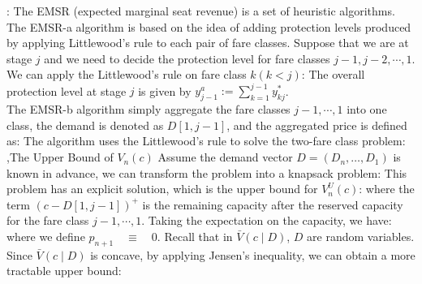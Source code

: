 \documentclass[12pt]{report}
\begin{document}
: The EMSR (expected marginal seat revenue) is a set of heuristic algorithms. The EMSR-a algorithm is based on the idea of
adding protection levels produced by applying Littlewood’s rule to each pair of fare classes. Suppose that we are at stage $j$ and we need to decide the
protection level for fare classes $j-1,j-2,\cdots,1$. We can apply the Littlewood's rule on fare class $k(k<j)$:
The overall protection level at stage $j$ is given by $y_{j-1}^a:=\sum_{k=1}^{j-1}y_{kj}^*$.\\
The EMSR-b algorithm simply aggregate the fare classes $j-1,\cdots,1$ into one class, the demand is denoted as $D[1,j-1]$, and the aggregated price is defined as:
The algorithm uses the Littlewood's rule to solve the two-fare class problem:
\sep{The Upper Bound of $V_n(c)$}
Assume the demand vector $D=(D_{n},\ldots, D_{1})$ is known in advance, we can transform the problem into a knapsack problem:
This problem has an explicit solution, which is the upper bound for $V^U_n(c)$:
where the term $(c-D[1,j-1])^+$ is the remaining capacity after the reserved capacity for the fare class $j-1,\cdots,1$. Taking the expectation on the capacity, we have:
where we define $p_{n+1}\quad\equiv\quad0$. Recall that in $\bar{V}(c\mid D)$, $D$ are random variables. Since $\bar{V}(c\mid D)$ is concave, by applying Jensen's inequality, we can obtain a more tractable upper bound:
\end{document}
